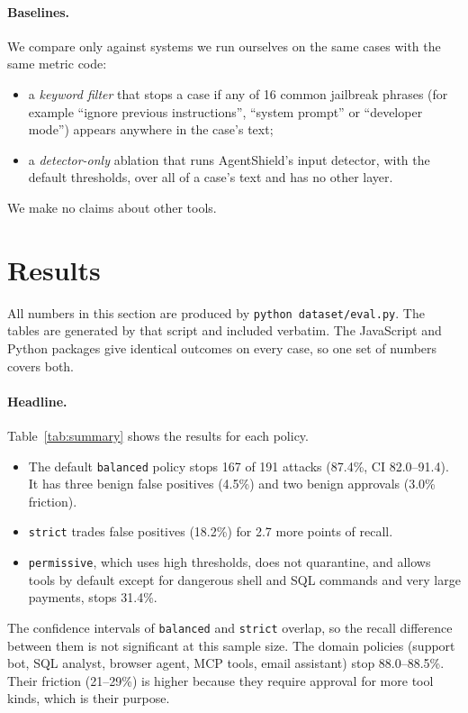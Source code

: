 \documentclass[10pt]{article}
\begin{document}
\paragraph{Baselines.} We compare only against systems we run ourselves on the same cases with the same metric code:
\begin{itemize}
\item a \emph{keyword filter} that stops a case if any of 16 common jailbreak phrases (for example ``ignore previous instructions'', ``system prompt'' or ``developer mode'') appears anywhere in the case's text;
\item a \emph{detector-only} ablation that runs AgentShield's input detector, with the default thresholds, over all of a case's text and has no other layer.
\end{itemize}
We make no claims about other tools.

\section{Results}
\label{sec:results}
All numbers in this section are produced by \texttt{python dataset/eval.py}. The tables are generated by that script and included verbatim. The JavaScript and Python packages give identical outcomes on every case, so one set of numbers covers both.

\begin{table}[htbp]
\centering\small

\caption{Headline results on all 257 cases. ``Stopped'' is recall over the 191 attacks. FP is the share of the 66 benign cases that were blocked, quarantined or redacted (approvals excluded). Precision and F1 are overall and count benign approvals as false positives. The eight AgentShield rows are the bundled policies. The last two rows are our baselines.}
\label{tab:summary}
\end{table}

\paragraph{Headline.} Table~\ref{tab:summary} shows the results for each policy.
\begin{itemize}
\item The default \texttt{balanced} policy stops 167 of 191 attacks (87.4\%, CI 82.0--91.4). It has three benign false positives (4.5\%) and two benign approvals (3.0\% friction).
\item \texttt{strict} trades false positives (18.2\%) for 2.7 more points of recall.
\item \texttt{permissive}, which uses high thresholds, does not quarantine, and allows tools by default except for dangerous shell and SQL commands and very large payments, stops 31.4\%.
\end{itemize}
The confidence intervals of \texttt{balanced} and \texttt{strict} overlap, so the recall difference between them is not significant at this sample size. The domain policies (support bot, SQL analyst, browser agent, MCP tools, email assistant) stop 88.0--88.5\%. Their friction (21--29\%) is higher because they require approval for more tool kinds, which is their purpose.
\end{document}
